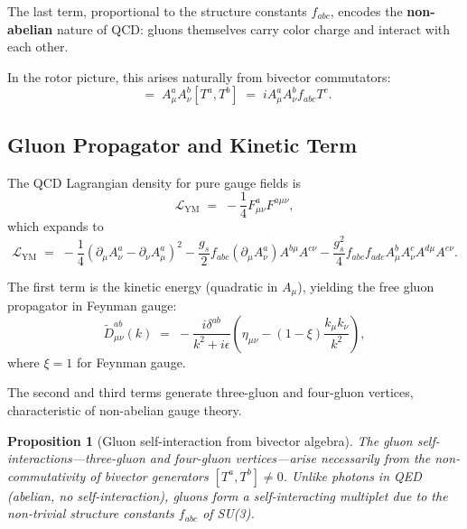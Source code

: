 \documentclass[11pt,a4paper]{article}
\newcommand{\Lag}{\mathcal{L}}
\theoremstyle{definition}
\theoremstyle{plain}
\newtheorem{proposition}{Proposition}[section]
\theoremstyle{remark}
\begin{document}
The last term, proportional to the structure constants $f_{abc}$, encodes the \textbf{non-abelian} nature of QCD: gluons themselves carry color charge and interact with each other.

In the rotor picture, this arises naturally from bivector commutators:
\begin{equation}
[A_\mu, A_\nu] \;=\; A_\mu^a A_\nu^b [T^a, T^b] \;=\; i A_\mu^a A_\nu^b f_{abc} T^c.
\end{equation}

\subsection{Gluon Propagator and Kinetic Term}

The QCD Lagrangian density for pure gauge fields is
\begin{equation}
\Lag_{\mathrm{YM}} \;=\; -\frac{1}{4}F_{\mu\nu}^a F^{a\mu\nu},
\label{eq:yang-mills-lagrangian}
\end{equation}
which expands to
\begin{equation}
\Lag_{\mathrm{YM}} \;=\; -\frac{1}{4}(\partial_\mu A_\nu^a - \partial_\nu A_\mu^a)^2 - \frac{g_s}{2}f_{abc}(\partial_\mu A_\nu^a)A^{b\mu}A^{c\nu} - \frac{g_s^2}{4}f_{abc}f_{ade}A_\mu^b A_\nu^c A^{d\mu}A^{e\nu}.
\end{equation}

The first term is the kinetic energy (quadratic in $A_\mu$), yielding the free gluon propagator in Feynman gauge:
\begin{equation}
\tilde{D}_{\mu\nu}^{ab}(k) \;=\; -\frac{i\delta^{ab}}{k^2 + i\epsilon}\left(\eta_{\mu\nu} - (1-\xi)\frac{k_\mu k_\nu}{k^2}\right),
\end{equation}
where $\xi = 1$ for Feynman gauge.

The second and third terms generate three-gluon and four-gluon vertices, characteristic of non-abelian gauge theory.

\begin{proposition}[Gluon self-interaction from bivector algebra]
The gluon self-interactions---three-gluon and four-gluon vertices---arise necessarily from the non-commutativity of bivector generators $[T^a, T^b] \neq 0$. Unlike photons in QED (abelian, no self-interaction), gluons form a self-interacting multiplet due to the non-trivial structure constants $f_{abc}$ of SU(3).
\end{proposition}

\vspace{1em}
\end{document}
